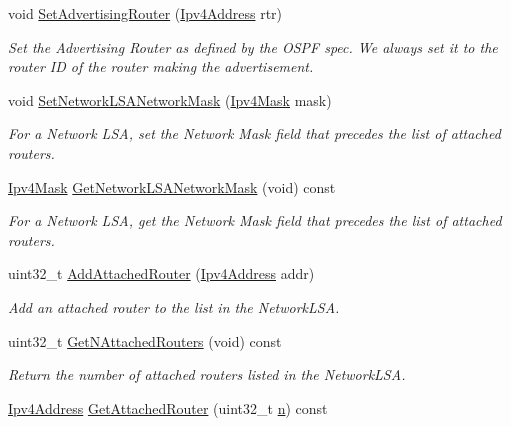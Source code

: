 \begin{DoxyCompactItemize}
void \hyperlink{classns3_1_1GlobalRoutingLSA_a97f6a00183d783cef4afb54c2216fa2f}{Set\+Advertising\+Router} (\hyperlink{classns3_1_1Ipv4Address}{Ipv4\+Address} rtr)
\begin{DoxyCompactList}\small\item\em Set the Advertising Router as defined by the O\+S\+PF spec. We always set it to the router ID of the router making the advertisement. \end{DoxyCompactList}\item 
void \hyperlink{classns3_1_1GlobalRoutingLSA_ad4b9b4146d6ce7e34cc860ae977e3cb1}{Set\+Network\+L\+S\+A\+Network\+Mask} (\hyperlink{classns3_1_1Ipv4Mask}{Ipv4\+Mask} mask)
\begin{DoxyCompactList}\small\item\em For a Network L\+SA, set the Network Mask field that precedes the list of attached routers. \end{DoxyCompactList}\item 
\hyperlink{classns3_1_1Ipv4Mask}{Ipv4\+Mask} \hyperlink{classns3_1_1GlobalRoutingLSA_a9a443ac873b15099be5fac288b714622}{Get\+Network\+L\+S\+A\+Network\+Mask} (void) const 
\begin{DoxyCompactList}\small\item\em For a Network L\+SA, get the Network Mask field that precedes the list of attached routers. \end{DoxyCompactList}\item 
uint32\+\_\+t \hyperlink{classns3_1_1GlobalRoutingLSA_a86209d0965f82b2a424caae435a770a3}{Add\+Attached\+Router} (\hyperlink{classns3_1_1Ipv4Address}{Ipv4\+Address} addr)
\begin{DoxyCompactList}\small\item\em Add an attached router to the list in the Network\+L\+SA. \end{DoxyCompactList}\item 
uint32\+\_\+t \hyperlink{classns3_1_1GlobalRoutingLSA_ac72db7c422429937970dc83d5f4b3264}{Get\+N\+Attached\+Routers} (void) const 
\begin{DoxyCompactList}\small\item\em Return the number of attached routers listed in the Network\+L\+SA. \end{DoxyCompactList}\item 
\hyperlink{classns3_1_1Ipv4Address}{Ipv4\+Address} \hyperlink{classns3_1_1GlobalRoutingLSA_a9bb91be870ea1826e88e27ecb7ac460c}{Get\+Attached\+Router} (uint32\+\_\+t \hyperlink{lte__link__budget__x2__handover__measures_8m_abdb05bc5a064cf642a06c83b3392f148}{n}) const 

\end{DoxyCompactItemize}
